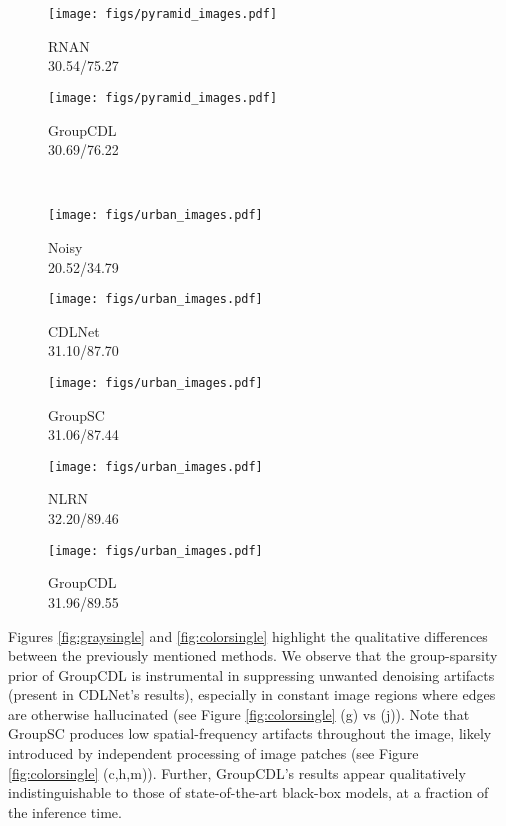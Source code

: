\documentclass[lettersize,journal]{IEEEtran}
\newcommand{\soa}{state-of-the-art }
\begin{document}
\begin{figure*}[thb]
\begin{subfigure}{0.19\textwidth}
\end{subfigure}\begin{subfigure}{0.19\textwidth}
    \centering
    \texttt{[image: figs/pyramid\_images.pdf]}
    \caption{RNAN \cite{zhang2019residual} \\ 30.54/75.27}
\end{subfigure}\begin{subfigure}{0.19\textwidth}
    \centering
    \texttt{[image: figs/pyramid\_images.pdf]}
    \caption{GroupCDL \\ 30.69/76.22}
\end{subfigure}     \\
    \begin{subfigure}{0.19\textwidth}
    \centering
    \texttt{[image: figs/urban\_images.pdf]}
    \caption{Noisy \\ 20.52/34.79}
\end{subfigure}\begin{subfigure}{0.19\textwidth}
    \centering
    \texttt{[image: figs/urban\_images.pdf]}
    \caption{CDLNet \cite{janjusevicCDLNet2022} \\ 31.10/87.70}
\end{subfigure}\begin{subfigure}{0.19\textwidth}
    \centering
    \texttt{[image: figs/urban\_images.pdf]}
    \caption{GroupSC \cite{lecouat2020nonlocal} \\ 31.06/87.44}
\end{subfigure}\begin{subfigure}{0.19\textwidth}
    \centering
    \texttt{[image: figs/urban\_images.pdf]}
    \caption{NLRN \cite{liu2018non} \\ 32.20/89.46}
\end{subfigure}\begin{subfigure}{0.19\textwidth}
    \centering
    \texttt{[image: figs/urban\_images.pdf]}
    \caption{GroupCDL \\ 31.96/89.55}
\end{subfigure}     \caption{
    Visual comparison of deep denoisers. Top and middle rows:
    color denoisers for . Bottom row: grayscale
    denoisers . PSNR/SSIM shown in
    respective captions. 
    }
    \label{fig:colorsingle}
\end{figure*}

Figures \ref{fig:graysingle} and \ref{fig:colorsingle} highlight the qualitative differences between the previously mentioned methods. We observe that the group-sparsity
prior of GroupCDL is instrumental in suppressing unwanted denoising artifacts (present in CDLNet's results),
especially in constant image regions where edges are otherwise hallucinated (see Figure \ref{fig:colorsingle} (g) vs (j)). Note that GroupSC produces low spatial-frequency artifacts throughout the image, likely introduced by independent processing of image patches (see Figure \ref{fig:colorsingle} (c,h,m)). Further, GroupCDL's results appear qualitatively indistinguishable to those of \soa black-box models, at a fraction of the inference time.
\end{document}
